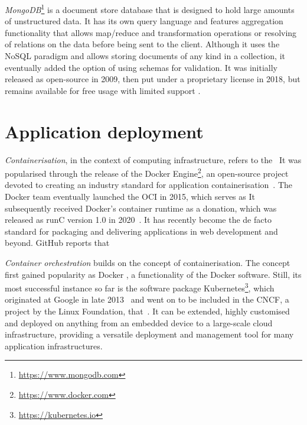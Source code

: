 \emph{MongoDB}\footnote{\url{https://www.mongodb.com}} is a document store database that is designed to hold large amounts of unstructured data.
It has its own query language and features aggregation functionality that allows map/reduce and transformation operations or resolving of relations on the data before being sent to the client.
Although it uses the \ac{NoSQL} paradigm and allows storing documents of any kind in a collection, it eventually added the option of using schemas for validation.
It was initially released as open-source in 2009, then put under a proprietary license in 2018, but remains available for free usage with limited support \parencite{mongodbProprietaryLicense}.

\section{Application deployment}
\label{sec:application-deployment}

\emph{Containerisation}, in the context of computing infrastructure, refers to the~ It was popularised through the release of the Docker Engine\footnote{\url{https://www.docker.com}}, an open-source project devoted to creating an industry standard for application containerisation~\parencite{dockerRelease}.
The Docker team eventually launched the \ac{OCI} in 2015, which serves as  It subsequently received Docker's container runtime as a donation, which was released as runC version 1.0 in 2020~\parencite{openContainerInitiative}.
It has recently become the de facto standard for packaging and delivering applications in web development and beyond.
GitHub reports that~

\emph{Container orchestration} builds on the concept of containerisation.  The concept first gained popularity as Docker , a functionality of the Docker software.
Still, its most successful instance so far is the software package Kubernetes\footnote{\url{https://kubernetes.io}}, which originated at Google in late 2013~\parencite{kubernetesHistory} and went on to be included in the \ac{CNCF}, a project by the Linux Foundation, that~.
It can be extended, highly customised and deployed on anything from an embedded device to a large-scale cloud infrastructure, providing a versatile deployment and management tool for many application infrastructures.
